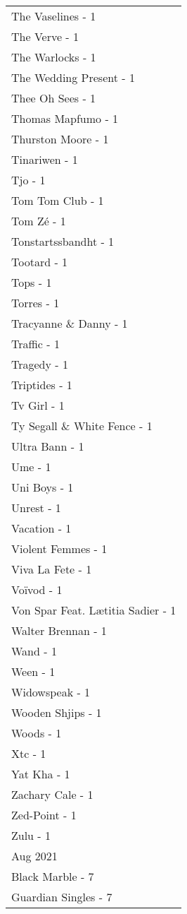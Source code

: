\documentclass[
]{article}
\begin{document}
\begin{longtable}{l}
The Vaselines - 1 \\ 
The Verve - 1 \\ 
The Warlocks - 1 \\ 
The Wedding Present - 1 \\ 
Thee Oh Sees - 1 \\ 
Thomas Mapfumo - 1 \\ 
Thurston Moore - 1 \\ 
Tinariwen - 1 \\ 
Tjo - 1 \\ 
Tom Tom Club - 1 \\ 
Tom Zé - 1 \\ 
Tonstartssbandht - 1 \\ 
Tootard - 1 \\ 
Tops - 1 \\ 
Torres - 1 \\ 
Tracyanne \& Danny - 1 \\ 
Traffic - 1 \\ 
Tragedy - 1 \\ 
Triptides - 1 \\ 
Tv Girl - 1 \\ 
Ty Segall \& White Fence - 1 \\ 
Ultra Bann - 1 \\ 
Ume - 1 \\ 
Uni Boys - 1 \\ 
Unrest - 1 \\ 
Vacation - 1 \\ 
Violent Femmes - 1 \\ 
Viva La Fete - 1 \\ 
Voïvod - 1 \\ 
Von Spar Feat. Lætitia Sadier - 1 \\ 
Walter Brennan - 1 \\ 
Wand - 1 \\ 
Ween - 1 \\ 
Widowspeak - 1 \\ 
Wooden Shjips - 1 \\ 
Woods - 1 \\ 
Xtc - 1 \\ 
Yat Kha - 1 \\ 
Zachary Cale - 1 \\ 
Zed-Point - 1 \\ 
Zulu - 1 \\ 
\midrule
\multicolumn{1}{l}{Aug 2021} \\ 
\midrule
Black Marble - 7 \\ 
Guardian Singles - 7 \\ 

\end{longtable}
\end{document}
